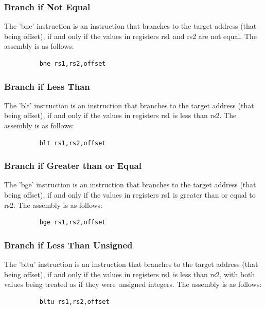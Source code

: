 \documentclass{article}
\begin{document}
\subsubsection{Branch if Not Equal}
\qquad
The 'bne' instruction is an instruction that branches to the target address (that being offset), if and only if the values in registers rs1 and rs2 are not equal. The assembly is as follows:
\begin{figure}[!htbp]
    \centering
    \begin{verbatim}
    bne rs1,rs2,offset
    \end{verbatim}
\end{figure}\newline

\subsubsection{Branch if Less Than}
\qquad
The 'blt' instruction is an instruction that branches to the target address (that being offset), if and only if the values in registers rs1 is less than rs2. The assembly is as follows:
\begin{figure}[!htbp]
    \centering
    \begin{verbatim}
    blt rs1,rs2,offset
    \end{verbatim}
\end{figure}\newline

\subsubsection{Branch if Greater than or Equal}
\qquad
The 'bge' instruction is an instruction that branches to the target address (that being offset), if and only if the values in registers rs1 is greater than or equal to rs2. The assembly is as follows:
\begin{figure}[!htbp]
    \centering
    \begin{verbatim}
    bge rs1,rs2,offset
    \end{verbatim}
\end{figure}\newline

\subsubsection{Branch if Less Than Unsigned}
\qquad
The 'bltu' instruction is an instruction that branches to the target address (that being offset), if and only if the values in registers rs1 is less than rs2, with both values being treated as if they were unsigned integers. The assembly is as follows:
\begin{figure}[!htbp]
    \centering
    \begin{verbatim}
    bltu rs1,rs2,offset
    \end{verbatim}
\end{figure}\newline
\end{document}
